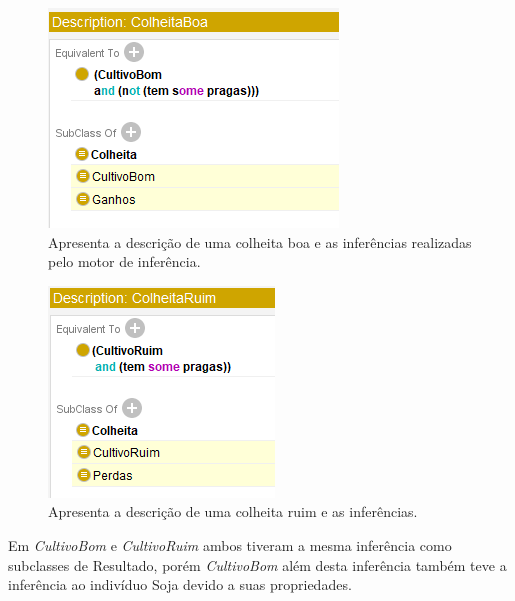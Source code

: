 \documentclass{article}
\begin{document}
    
    \begin{figure}[!htp]
        \centering %
        \includegraphics[width=.5\textwidth]{imagens/Inf_2.png} %
        \caption{Apresenta a descrição de uma colheita boa e as inferências realizadas pelo motor de inferência.}
        \label{figura:descricaoColhetaBoa}
    \end{figure}
    
     \begin{figure}[!htp]
        \centering %
        \includegraphics[width=.5\textwidth]{imagens/inf_3.png} %
        \caption{Apresenta a descrição de uma colheita ruim e as inferências.}
        \label{figura:descColhetaRuim}
    \end{figure}
    
    Em \textit{CultivoBom} e \textit{CultivoRuim} ambos tiveram a mesma inferência como subclasses de Resultado, porém \textit{CultivoBom} além desta inferência também teve a inferência ao indivíduo Soja devido a suas propriedades.
    
\end{document}
